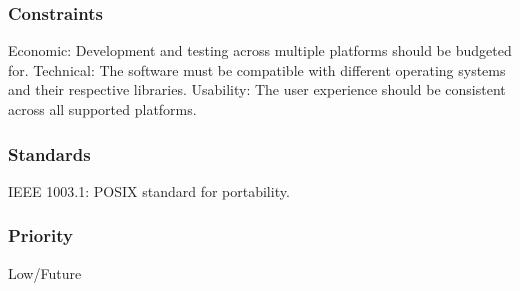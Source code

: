 \subsubsection{Constraints}
Economic: Development and testing across multiple platforms should be budgeted for.
Technical: The software must be compatible with different operating systems and their respective libraries.
Usability: The user experience should be consistent across all supported platforms.
\subsubsection{Standards}
IEEE 1003.1: POSIX standard for portability.
\subsubsection{Priority}
Low/Future
